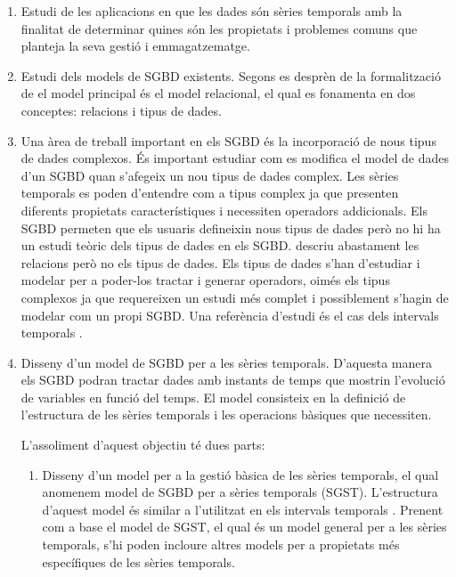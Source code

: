 \begin{enumerate}

\item Estudi de les aplicacions en que les dades són sèries temporals
  amb la finalitat de determinar quines són les propietats i problemes
  comuns que planteja la seva gestió i emmagatzematge.

\item Estudi dels models de SGBD existents. Segons es desprèn de la
  formalització de \textcite{date:introduction} el model principal és
  el model relacional, el qual es fonamenta en dos conceptes:
  relacions i tipus de dades. 

\item Una àrea de treball important en els SGBD és la incorporació de
  nous tipus de dades complexos. És important estudiar com es modifica
  el model de dades d'un SGBD quan s'afegeix un nou tipus de dades
  complex.  Les sèries temporals es poden d'entendre com a tipus
  complex ja que presenten diferents propietats característiques i
  necessiten operadors addicionals.  Els SGBD permeten que els usuaris
  defineixin nous tipus de dades \parencite{stonebraker86} però no hi
  ha un estudi teòric dels tipus de dades en els SGBD.
  \textcite{date:introduction} descriu abastament les relacions però
  no els tipus de dades. Els tipus de dades s'han d'estudiar i modelar
  per a poder-los tractar i generar operadors, oimés els tipus
  complexos ja que requereixen un estudi més complet i possiblement
  s'hagin de modelar com un propi SGBD. Una referència d'estudi és el
  cas dels intervals
  temporals \parencite{date02:_tempor_data_relat_model}.

\item Disseny d'un model de SGBD per a les sèries temporals. D'aquesta
  manera els SGBD podran tractar dades amb instants de temps que
  mostrin l'evolució de variables en funció del temps. El model
  consisteix en la definició de l'estructura de les sèries temporals i
  les operacions bàsiques que necessiten.

  L'assoliment d'aquest objectiu té dues parts:

  \begin{enumerate}
  \item Disseny d'un model per a la gestió bàsica de les sèries
    temporals, el qual anomenem model de SGBD per a sèries temporals
    (SGST).  L'estructura d'aquest model és similar a l'utilitzat en
    els intervals
    temporals \parencite{date02:_tempor_data_relat_model}.  Prenent
    com a base el model de SGST, el qual és un model general per a les
    sèries temporals, s'hi poden incloure altres models per a
    propietats més específiques de les sèries temporals.


\end{enumerate}
\end{enumerate}
